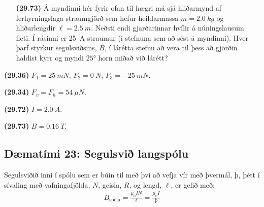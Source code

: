 \ifdefined \wholebook \else\documentclass[oneside]{book}\usepackage{EdlBook}\graphicspath{{figures/}}
\begin{document}
\begin{enumerate}[label = \textbf{(\alph*)}]
\item[\textbf{(29.73)}] Á myndinni hér fyrir ofan til hægri má sjá hliðarmynd af ferhyrningslaga straumgjörð sem hefur heildarmassa $m = \SI{2.0}{kg}$ og hliðarlengdir $\ell = \SI{2.5}{m}$. Neðsti endi gjarðarinnar hvílir á núningslausum fleti. Í rásinni er \SI{25}{A} straumur (í stefnuna sem að sést á myndinni). Hver þarf styrkur segulsviðsins, $B$, í lárétta stefnu að vera til þess að gjörðin haldist kyrr og myndi $\ang{25}$ horn miðað við lárétt?


\end{enumerate}


\begin{tcolorbox}
\begin{enumerate*}[label = ]
  \item \textbf{(29.36)} $F_1 = \SI{25}{mN}$, $F_2 = \SI{0}{N}$, $F_3 = \SI{-25}{mN}$.
  \item \textbf{(29.34)} $F_v = F_h = \SI{54}{\mu N}$.
  \item \textbf{(29.72)} $I = \SI{2.0}{A}$.
  \item \textbf{(29.73)} $B = \SI{0.16}{T}$.
\end{enumerate*}
\end{tcolorbox}


\newpage

\subsection*{Dæmatími 23: Segulsvið langspólu}

\begin{tcolorbox}
Segulsviðið inni í spólu sem er búin til með því að vefja vír með þvermál, $þ$, þétt í sívaling með vafningafjölda, $N$, geisla, $R$, og lengd, $\ell$, er gefið með: 
\begin{align*}
    B_{\text{spóla}} = \frac{\mu_0 I N}{\ell} = \frac{\mu_0 I}{þ}
\end{align*}
\end{tcolorbox}
\end{document}
